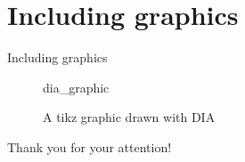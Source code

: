\documentclass{beamer}
\begin{document}
\section{Including graphics}
\begin{frame}{Including graphics}
\begin{figure}
\begin{center}
{dia_graphic}
\caption{A tikz graphic drawn with DIA}
\end{center}
\end{figure}
\end{frame}


\begin{frame}[plain]
\begin{center}
Thank you for your attention!
\end{center}
\end{frame}
\end{document}
